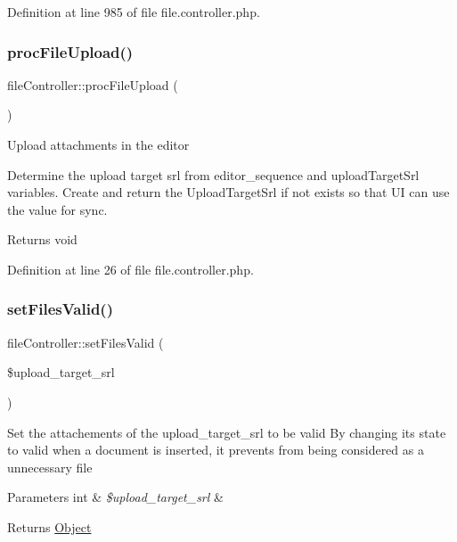 Definition at line 985 of file file.\+controller.\+php.

\mbox{\label{classfileController_a149fa7253922771172674963f700c2d6}} 
\subsubsection{\texorpdfstring{proc\+File\+Upload()}{procFileUpload()}}
{\footnotesize\ttfamily file\+Controller\+::proc\+File\+Upload (\begin{DoxyParamCaption}{ }\end{DoxyParamCaption})}

Upload attachments in the editor

Determine the upload target srl from editor\+\_\+sequence and upload\+Target\+Srl variables. Create and return the Upload\+Target\+Srl if not exists so that UI can use the value for sync.

\begin{DoxyReturn}{Returns}
void 
\end{DoxyReturn}


Definition at line 26 of file file.\+controller.\+php.

\mbox{\label{classfileController_a801efe17bf09b43279f82504b748c5ee}} 
\subsubsection{\texorpdfstring{set\+Files\+Valid()}{setFilesValid()}}
{\footnotesize\ttfamily file\+Controller\+::set\+Files\+Valid (\begin{DoxyParamCaption}\item[{}]{\$upload\+\_\+target\+\_\+srl }\end{DoxyParamCaption})}

Set the attachements of the upload\+\_\+target\+\_\+srl to be valid By changing its state to valid when a document is inserted, it prevents from being considered as a unnecessary file


\begin{DoxyParams}[1]{Parameters}
int & {\em \$upload\+\_\+target\+\_\+srl} & \\
\hline
\end{DoxyParams}
\begin{DoxyReturn}{Returns}
\hyperlink{classObject}{Object} 
\end{DoxyReturn}


